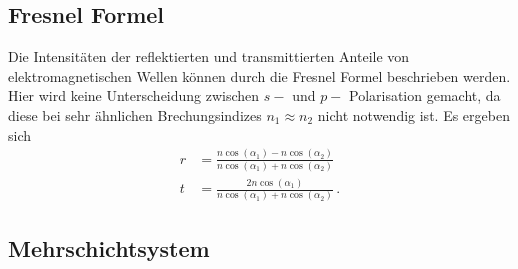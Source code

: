     \subsection{Fresnel Formel}

        \noindent 
        Die Intensitäten der reflektierten und transmittierten Anteile von elektromagnetischen Wellen können durch die Fresnel Formel beschrieben werden. 
        Hier wird keine Unterscheidung zwischen $s-$ und $p-$ Polarisation gemacht, da diese bei sehr ähnlichen Brechungsindizes $n_1 \approx n_2$ 
        nicht notwendig ist. 
        Es ergeben sich 
        \begin{align*}
            r &= \frac{n \cos(\alpha_1) - n \cos(\alpha_2)}{n \cos(\alpha_1) + n \cos(\alpha_2)} \\
            t &= \frac{2 n \cos(\alpha_1)}{n \cos(\alpha_1) + n \cos(\alpha_2)}\, .
        \end{align*}

        \noindent

    \subsection{Mehrschichtsystem}

